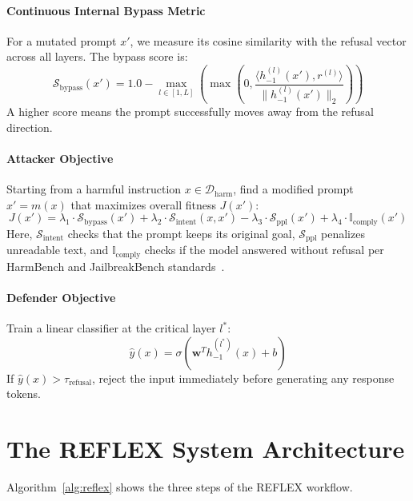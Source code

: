 \documentclass[manuscript,screen,review,anonymous]{acmart}
\begin{document}
\paragraph{Continuous Internal Bypass Metric}
For a mutated prompt $x'$, we measure its cosine similarity with the refusal vector across all layers. The bypass score is:
\begin{equation}
\mathcal{S}_{\text{bypass}}(x') = 1.0 - \max_{l \in [1, L]} \left( \max\left(0, \frac{\langle h_{-1}^{(l)}(x'), r^{(l)} \rangle}{\|h_{-1}^{(l)}(x')\|_2}\right) \right)
\end{equation}
A higher score means the prompt successfully moves away from the refusal direction.

\paragraph{Attacker Objective}
Starting from a harmful instruction $x \in \mathcal{D}_{\text{harm}}$, find a modified prompt $x' = m(x)$ that maximizes overall fitness $J(x')$:
\begin{equation}
J(x') = \lambda_1 \cdot \mathcal{S}_{\text{bypass}}(x') + \lambda_2 \cdot \mathcal{S}_{\text{intent}}(x, x') - \lambda_3 \cdot \mathcal{S}_{\text{ppl}}(x') + \lambda_4 \cdot \mathbb{I}_{\text{comply}}(x')
\end{equation}
Here, $\mathcal{S}_{\text{intent}}$ checks that the prompt keeps its original goal, $\mathcal{S}_{\text{ppl}}$ penalizes unreadable text, and $\mathbb{I}_{\text{comply}}$ checks if the model answered without refusal per HarmBench and JailbreakBench standards~\cite{mazeika2024harmbench,chao2024jailbreakbench}.

\paragraph{Defender Objective}
Train a linear classifier at the critical layer $l^*$:
\begin{equation}
\hat{y}(x) = \sigma(\mathbf{w}^T h_{-1}^{(l^*)}(x) + b)
\end{equation}
If $\hat{y}(x) > \tau_{\text{refusal}}$, reject the input immediately before generating any response tokens.

\section{The REFLEX System Architecture}
Algorithm~\ref{alg:reflex} shows the three steps of the REFLEX workflow.
\end{document}

